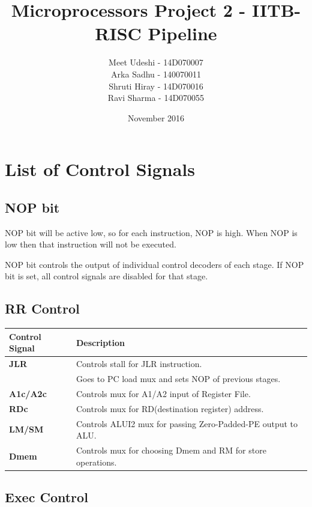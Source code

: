\documentclass{article}
\title{Microprocessors Project 2 - IITB-RISC Pipeline}
\author{Meet Udeshi - 14D070007\\
Arka Sadhu - 140070011\\
Shruti Hiray - 14D070016\\
Ravi Sharma - 14D070055
}
\date{November 2016}
\begin{document}
\maketitle                      
 
\section*{List of Control Signals}

\subsection*{NOP bit}

NOP bit will be active low, so for each instruction, NOP is high. When NOP is
low then that instruction will not be executed.

NOP bit controls the output of individual control decoders of each stage.
If NOP bit is set, all control signals are disabled for that stage.

\subsection*{RR Control}

\begin{tabular}{|l|l|}
\hline
\textbf{Control Signal} & \textbf{Description}\\
\hline
\textbf{JLR} & Controls stall for JLR instruction. \\
             & Goes to PC load mux and sets NOP of previous stages.\\
\hline
\textbf{A1c/A2c} & Controls mux for A1/A2 input of Register File.\\
\hline
\textbf{RDc} & Controls mux for RD(destination register) address.\\
\hline
\textbf{LM/SM} & Controls ALUI2 mux for passing Zero-Padded-PE output to ALU.\\
\hline
\textbf{Dmem} & Controls mux for choosing Dmem and RM for store operations.\\
\hline
\end{tabular}

\subsection*{Exec Control}
\end{document}
